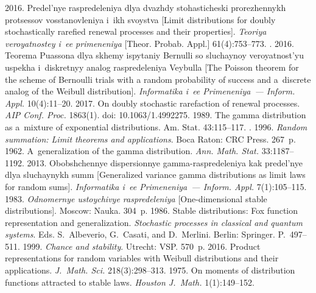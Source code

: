 \begin{multicols}{2}
{{\begin{thebibliography}{99}
 2016. 
Predel'nye raspredeleniya dlya dvazhdy stohasticheski prorezhennykh 
protsessov vos\-sta\-nov\-le\-niya i~ikh svoystva [Limit 
distributions for doubly stochastically 
rarefied renewal processes and their properties]. 
\textit{Teoriya veroyatnostey i~ee primeneniya} [Theor. Probab. Appl.] 61(4):753--773.
. 
2016. Teorema Puassona dlya skhemy ispytaniy Bernulli so sluchaynoy 
veroyatnost'yu uspekha i~diskretnyy analog raspredeleniya Veybulla 
[The Poisson theorem for the scheme of Bernoulli trials with a random probability
of success and a~discrete analog of the Weibull distribution]. 
\textit{Informatika i~ee Primeneniya~--- Inform. Appl.} 10(4):11--20.
2017. On doubly stochastic
rarefaction of renewal processes. 
\textit{AIP Conf. Proc.} 1863(1). doi: 10.1063/1.4992275.
 1989. The gamma distribution as 
a~mixture of exponential distributions. Am. Stat. 43:115--117.
. 1996. 
\textit{Random summation: Limit theorems and applications}. 
Boca Raton: CRC Press. 267~p.
 1962. 
A~generalization of the gamma distribution. 
\textit{Ann. Math. Stat.} 33:1187--1192.
 2013. 
Obobshchennye dispersionnye gam\-ma-ras\-pre\-de\-le\-niya kak predel'nye 
dlya sluchaynykh summ [Generalized variance gamma distributions as limit 
laws for random sums]. \textit{Informatika i~ee Primeneniya~--- Inform. Appl.}
7(1):105--115.
 1983. \textit{Odnomernye ustoychivye raspredeleniya} 
[One-dimensional stable distributions]. Moscow: Nauka. 304~p.
 1986. 
Stable distributions: Fox function representation and generalization. 
\textit{Stochastic processes in classical and quantum systems}. 
Eds. S.~Albeverio, G.~Casati, and D.~Merlini. Berlin: Springer. P.~497--511.
1999. \textit{Chance and stability}. Utrecht: VSP. 570~p.
 2016. Product representations for random variables with 
 Weibull distributions and their applications. 
\textit{J.~Math. Sci.} 218(3):298--313.
 1975. On moments of distribution functions attracted to stable laws. 
\textit{Houston J.~Math.} 1(1):149--152.

\end{thebibliography}}}
\end{multicols}
